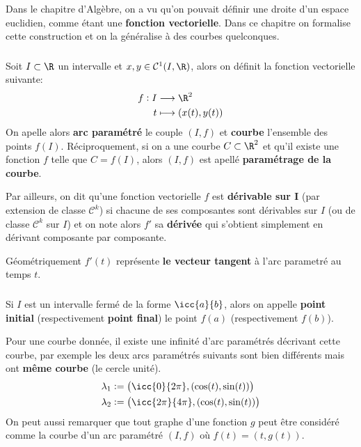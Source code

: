 \chapter*{} %

Dans le chapitre d'Algèbre, on a vu qu'on pouvait définir une droite d'un espace euclidien, comme étant une \textbf{fonction vectorielle}. Dans ce chapitre on formalise cette construction et on la généralise à des courbes quelconques.

\subsection*{}
Soit \(I \subset \R\) un intervalle et \(x, y \in \mathcal{C}^1(I, \R)\), alors on définit la fonction vectorielle suivante:
\[
   \begin{aligned}
      f: I &\longrightarrow \R^2\\
      t &\longmapsto (x(t), y(t))
   \end{aligned}
\]
On apelle alors \textbf{arc paramétré} le couple \((I, f)\) et \textbf{courbe} l'ensemble des points \(f(I)\). Réciproquement, si on a une courbe \(C \subset \R^2\) et qu'il existe une fonction \(f\) telle que \(C = f(I)\), alors \((I, f)\) est apellé \textbf{paramétrage de la courbe}.\<

Par ailleurs, on dit qu'une fonction vectorielle \(f\) est \textbf{dérivable sur I} (par extension de classe \(\mathcal{C}^k\)) si chacune de ses composantes sont dérivables sur \(I\) (ou de classe \(\mathcal{C}^k\) sur \(I\)) et on note alors \(f'\) sa \textbf{dérivée} qui s'obtient simplement en dérivant composante par composante.\<

Géométriquement \(f'(t)\) représente \textbf{le vecteur tangent} à l'arc parametré au temps \(t\).

\subsection*{}
Si \(I\) est un intervalle fermé de la forme \(\icc{a}{b}\), alors on appelle \textbf{point initial} (respectivement \textbf{point final}) le point \(f(a)\) (respectivement \(f(b)\)).\<

Pour une courbe donnée, il existe une infinité d'arc paramétrés décrivant cette courbe, par exemple les deux arcs paramétrés suivants sont bien différents mais ont \textbf{même courbe} (le cercle unité).
\begin{align*}
   \lambda_1 &:= \bigl(\icc{0}{2\pi}, (\cos(t), \sin(t))\bigl) \\
   \lambda_2 &:= \bigl(\icc{2\pi}{4\pi}, (\cos(t), \sin(t))\bigl)
\end{align*}
On peut aussi remarquer que tout graphe d'une fonction \(g\) peut être considéré comme la courbe d'un arc paramétré \((I, f)\) où \(f(t) = (t, g(t))\). \<

